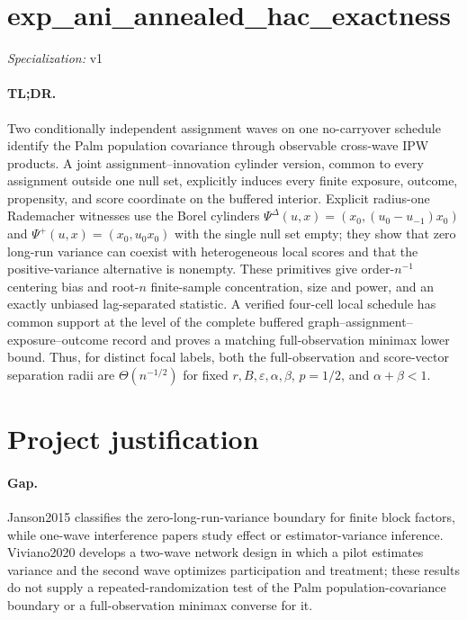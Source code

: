 \documentclass{article}
\begin{document}
\sloppy

\section*{exp\_\allowbreak{}ani\_\allowbreak{}annealed\_\allowbreak{}hac\_\allowbreak{}exactness}

\noindent\textit{Specialization:} v1\par

\paragraph{TL;DR.} Two conditionally independent assignment waves on one no-carryover schedule identify the Palm population covariance through observable cross-wave IPW products. A joint assignment--innovation cylinder version, common to every assignment outside one null set, explicitly induces every finite exposure, outcome, propensity, and score coordinate on the buffered interior. Explicit radius-one Rademacher witnesses use the Borel cylinders \(\Psi^{\Delta}(u,x)=(x_0,(u_0-u_{-1})x_0)\) and \(\Psi^+(u,x)=(x_0,u_0x_0)\) with the single null set empty; they show that zero long-run variance can coexist with heterogeneous local scores and that the positive-variance alternative is nonempty. These primitives give order-\(n^{-1}\) centering bias and root-\(n\) finite-sample concentration, size and power, and an exactly unbiased lag-separated statistic. A verified four-cell local schedule has common support at the level of the complete buffered graph--assignment--exposure--outcome record and proves a matching full-observation minimax lower bound. Thus, for distinct focal labels, both the full-observation and score-vector separation radii are \(\Theta(n^{-1/2})\) for fixed \(r,B,\varepsilon,\alpha,\beta\), \(p=1/2\), and \(\alpha+\beta<1\).

\section{Project justification}

\paragraph{Gap.} Janson2015 classifies the zero-long-run-variance boundary for finite block factors, while one-wave interference papers study effect or estimator-variance inference. Viviano2020 develops a two-wave network design in which a pilot estimates variance and the second wave optimizes participation and treatment; these results do not supply a repeated-randomization test of the Palm population-covariance boundary or a full-observation minimax converse for it.
\end{document}
